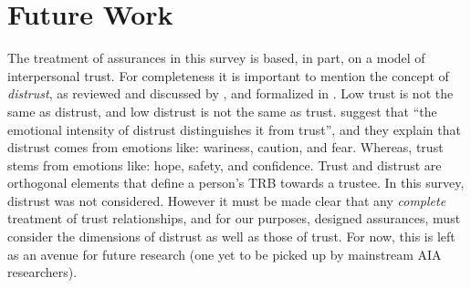 \section{Future Work} \label{sec:future_work}

The treatment of assurances in this survey is based, in part, on a model of interpersonal trust. For completeness it is important to mention the concept of \textit{distrust}, as reviewed and discussed by \citet{Lewicki1998-ox}, and formalized in \citet{McKnight2001-gz}. Low trust is not the same as distrust, and low distrust is not the same as trust. \citet{McKnight2001-gz} suggest that ``the emotional intensity of distrust distinguishes it from trust'', and they explain that distrust comes from emotions like: wariness, caution, and fear. Whereas, trust stems from emotions like: hope, safety, and confidence. Trust and distrust are orthogonal elements that define a person's TRB towards a trustee. In this survey, distrust was not considered. However it must be made clear that any \emph{complete} treatment of trust relationships, and for our purposes, designed assurances, must consider the dimensions of distrust as well as those of trust. For now, this is left as an avenue for future research (one yet to be picked up by mainstream AIA researchers).
